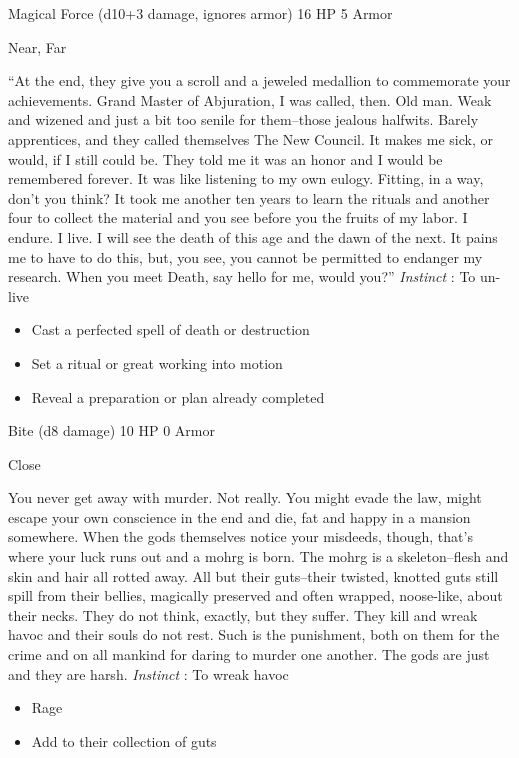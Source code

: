 

 Magical Force (d10+3 damage, ignores armor) 16 HP 5 Armor


 Near, Far


 ``At the end, they give you a scroll and a jeweled medallion to commemorate your achievements. Grand Master of Abjuration, I was called, then. Old man. Weak and wizened and just a bit too senile for them--those jealous halfwits. Barely apprentices, and they called themselves The New Council. It makes me sick, or would, if I still could be. They told me it was an honor and I would be remembered forever. It was like listening to my own eulogy. Fitting, in a way, don't you think? It took me another ten years to learn the rituals and another four to collect the material and you see before you the fruits of my labor. I endure. I live. I will see the death of this age and the dawn of the next. It pains me to have to do this, but, you see, you cannot be permitted to endanger my research. When you meet Death, say hello for me, would you?'' \emph{Instinct}
: To un-live
\begin{itemize}
\item Cast a perfected spell of death or destruction
\item Set a ritual or great working into motion
\item Reveal a preparation or plan already completed

\end{itemize}




 Bite (d8 damage) 10 HP 0 Armor


 Close


 You never get away with murder. Not really. You might evade the law, might escape your own conscience in the end and die, fat and happy in a mansion somewhere. When the gods themselves notice your misdeeds, though, that's where your luck runs out and a mohrg is born. The mohrg is a skeleton--flesh and skin and hair all rotted away. All but their guts--their twisted, knotted guts still spill from their bellies, magically preserved and often wrapped, noose-like, about their necks. They do not think, exactly, but they suffer. They kill and wreak havoc and their souls do not rest. Such is the punishment, both on them for the crime and on all mankind for daring to murder one another. The gods are just and they are harsh. \emph{Instinct}
: To wreak havoc
\begin{itemize}
\item Rage
\item Add to their collection of guts

\end{itemize}


